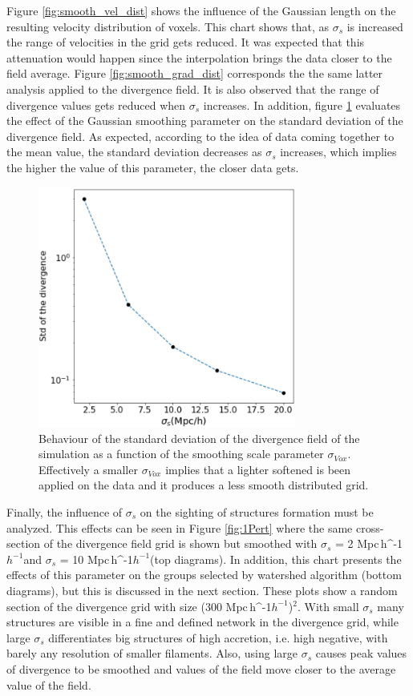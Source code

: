\documentclass[usenatbib]{mnras}
\newcommand{\Mpch}{\,{\rm Mpc}\,\ifmmode h^{-1}\else $h^{-1}$\fi}
\begin{document}
Figure \ref{fig:smooth_vel_dist} shows the influence of the Gaussian length on the resulting velocity distribution of voxels. This chart shows that, as $\sigma_s$ is increased the range of velocities in the grid gets reduced. It was expected that this attenuation would happen since the interpolation brings the data closer to the field average. Figure \ref{fig:smooth_grad_dist} corresponds the the same latter analysis applied to the divergence field. It is also observed that the range of divergence values gets reduced when $\sigma_s$ increases. In addition, figure \ref{fig:std_smooth} evaluates the effect of the Gaussian smoothing parameter on the standard deviation of the divergence field. As expected, according to the idea of data coming together to the mean value, the standard deviation decreases as $\sigma_s$ increases, which implies the higher the value of this parameter, the closer data gets.



\begin{figure}
    \centering
    \includegraphics[width=240pt]{std_smooth.pdf}
    \caption{Behaviour of the standard deviation of the divergence field of
      the simulation as a function of the smoothing scale parameter
      $\sigma_{Vox}$. Effectively a smaller $\sigma_{Vox}$ implies that a lighter softened is been applied
      on the data and it produces a less smooth distributed grid.} 
    \label{fig:std_smooth}
\end{figure}


Finally, the influence of $\sigma_s$ on the sighting of structures formation must be analyzed. This effects can be seen in Figure \ref{fig:1Pert} where the same cross-section of the divergence field grid is shown but smoothed with $\sigma_s$ = 2\,\Mpch and $\sigma_s$ = 10\,\Mpch (top diagrams). In addition, this chart presents the effects of this parameter on the groups selected by watershed algorithm (bottom diagrams), but this is discussed in the next section. These plots show a random section of the divergence grid with size (300\,\Mpch)$^2$. With small $\sigma_{s}$ many structures are visible in a fine and defined network in the divergence grid, while large $\sigma_{s}$ differentiates big structures of high accretion, i.e. high negative, with barely any resolution of smaller filaments. Also, using large $\sigma_{s}$ causes peak values of divergence to be smoothed and values of the field move closer to  the average value of the field. 
\end{document}
